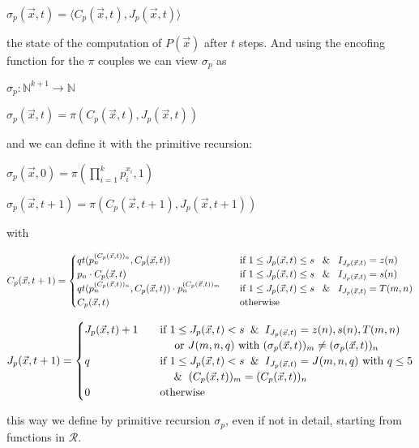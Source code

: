 \documentclass{amsbook}
\newcommand{\nat}{\ensuremath{\mathbb{N}}}
\theoremstyle{definition}
\theoremstyle{remark}
\numberwithin{section}{chapter}
\numberwithin{equation}{chapter}
\begin{document}
\begin{center}
    $\sigma_p(\vec{x},t) = \langle C_p(\vec{x},t), J_p(\vec{x},t) \rangle$
\end{center}

the state of the computation of $P(\vec{x})$ after $t$ steps. And using the encofing function for the $\pi$ couples we can view $\sigma_p$ as

$\sigma_p : \nat^{k+1} \rightarrow \nat$

$\sigma_p(\vec{x}, t) = \pi(C_p(\vec{x},t), J_p(\vec{x},t))$

and we can define it with the primitive recursion:

$\sigma_p(\vec{x}, 0) = \pi(\prod\limits_{i=1}^k p_i^{x_i}, 1)$

$\sigma_p(\vec{x}, t+1) = \pi(C_p(\vec{x},t+1), J_p(\vec{x},t+1))$

with

\[
  C_p(\vec{x},t+1) = \begin{cases}
    qt(p_n^{(C_p(\vec{x},t))_n}, C_p(\vec{x},t)) & \quad \text{if }1 \leq J_p(\vec{x},t) \leq s \; \And \; I_{J_p(\vec{x},t)} = z(n) \\
    p_n \cdot C_p(\vec{x},t) & \quad \text{if }1 \leq J_p(\vec{x},t) \leq s \; \And \; I_{J_p(\vec{x},t)} = s(n) \\
    qt(p_n^{(C_p(\vec{x},t))_n}, C_p(\vec{x},t)) \cdot p_n^{(C_p(\vec{x},t))_m} & \quad \text{if }1 \leq J_p(\vec{x},t) \leq s \; \And \; I_{J_p(\vec{x},t)} = T(m,n) \\
    C_p(\vec{x}, t) & \quad \text{otherwise}
\end{cases}
\]

\[
  J_p(\vec{x}, t+1) = \begin{cases}
    J_p(\vec{x}, t) + 1 & \quad \text{if } 1 \leq J_p(\vec{x}, t) < s \And I_{J_p(\vec{x}, t)} = z(n), s(n), T(m,n) \\
    & \quad \quad \text{ or } J(m,n,q) \text{ with } (\sigma_p(\vec{x}, t))_m \neq (\sigma_p(\vec{x}, t))_n \\
    q & \quad \text{if } 1 \leq J_p(\vec{x}, t) < s \And I_{J_p(\vec{x}, t)} = J(m,n,q) \text{ with } q\leq 5 \\
    & \quad \quad \And (C_p(\vec{x}, t))_m = (C_p(\vec{x}, t))_n \\
    0 & \quad \text{otherwise}
  \end{cases}
\]

this way we define by primitive recursion $\sigma_p$, even if not in
detail, starting from functions in $\mathcal{R}$.
\end{document}
